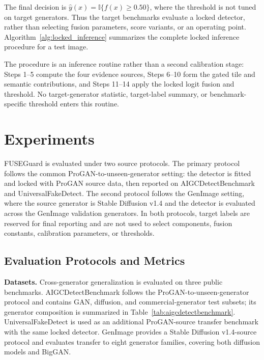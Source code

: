 \documentclass[letterpaper,journal]{IEEEtran}
\begin{document}
The final decision is $\hat{y}(x)=\mathbb{I}\{f(x)\geq0.50\}$, where the threshold is not tuned on target generators. Thus the target benchmarks evaluate a locked detector, rather than selecting fusion parameters, score variants, or an operating point. Algorithm~\ref{alg:locked_inference} summarizes the complete locked inference procedure for a test image.



The procedure is an inference routine rather than a second calibration stage: Steps 1--5 compute the four evidence sources, Steps 6--10 form the gated tile and semantic contributions, and Steps 11--14 apply the locked logit fusion and threshold. No target-generator statistic, target-label summary, or benchmark-specific threshold enters this routine.


\section{Experiments}
\label{sec:experiments}
FUSEGuard is evaluated under two source protocols. The primary protocol follows the common ProGAN-to-unseen-generator setting: the detector is fitted and locked with ProGAN source data, then reported on AIGCDetectBenchmark \cite{zhong2023patchcraft} and UniversalFakeDetect. The second protocol follows the GenImage setting, where the source generator is Stable Diffusion v1.4 and the detector is evaluated across the GenImage validation generators. In both protocols, target labels are reserved for final reporting and are not used to select components, fusion constants, calibration parameters, or thresholds.

\subsection{Evaluation Protocols and Metrics}
\label{sec:experimental_setup}

\textbf{Datasets.}
Cross-generator generalization is evaluated on three public benchmarks. AIGCDetectBenchmark \cite{zhong2023patchcraft} follows the ProGAN-to-unseen-generator protocol and contains GAN, diffusion, and commercial-generator test subsets; its generator composition is summarized in Table~\ref{tab:aigcdetectbenchmark}. UniversalFakeDetect \cite{ojha2023univfd} is used as an additional ProGAN-source transfer benchmark with the same locked detector. GenImage \cite{zhu2023genimage} provides a Stable Diffusion v1.4-source protocol and evaluates transfer to eight generator families, covering both diffusion models and BigGAN.
\end{document}
